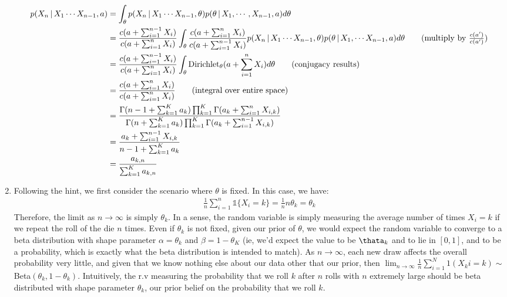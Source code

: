 \documentclass[submit]{harvardml}
\newcommand{\given}{\,|\,}
\theoremstyle{plain}
\begin{document}
\begin{enumerate}[label=(\alph*)]
\begin{align*}
p(X_n \given X_1 \cdots X_{n-1},a) &= \int_{\theta} p(X_n \given  X_1 \cdots X_{n-1}, \theta)p(\theta \given X_1, \cdots, X_{n-1}, a)  d\theta \\
&= \frac{c(a + \sum_{i=1}^{n-1}X_i)}{c(a + \sum_{i=1}^n X_i)} \int_{\theta} \frac{c(a + \sum_{i=1}^n X_i)}{c(a + \sum_{i=1}^{n-1}X_i)} p(X_n \given  X_1 \cdots X_{n-1}, \theta)p(\theta \given X_1, \cdots X_{n-1}, a) d\theta \tag{multiply by $\frac{c(a')}{c(a')}$} \\
&= \frac{c(a + \sum_{i=1}^{n-1}X_i)}{c(a + \sum_{i=1}^n X_i)} \int_{\theta} \text{Dirichlet}_{\theta}(a + \sum_{i=1}^n X_i) d\theta \tag{conjugacy results}\\
&= \frac{c(a + \sum_{i=1}^n X_i)}{c(a + \sum_{i=1}^n X_i)} \tag{integral over entire space} \\
&= \frac{\Gamma(n - 1 + \sum_{k=1}^{K}{a_k})\prod_{k=1}^K \Gamma(a_k + \sum_{i=1}^n X_{i,k})}{\Gamma(n + \sum_{k=1}^K a_k)\prod_{k=1}^K \Gamma(a_k + \sum_{i=1}^{n-1}X_{i,k})} \\
&= \frac{a_k + \sum_{i=1}^{n-1}X_{i,k}}{n - 1 + \sum_{k=1}^K a_k}\\
&= \frac{a_{k,n}}{\sum_{k=1}^K a_{k,n}}
\end{align*}
\item Following the hint, we first consider the scenario where $\theta$ is fixed. In this case, we have:
\begin{align*}
\frac{1}{n} \sum_{i=1}^n \mathbb{1} \{X_i = k\} =  \frac{1}{n}n\theta_k = \theta_k
\end{align*}
Therefore, the limit as $n \to \infty$ is simply $\theta_k$. In a sense, the random variable is simply measuring the average number of times $X_i = k$ if we repeat the roll of the die $n$ times. Even if $\theta_k$ is not fixed, given our prior of $\theta$, we would expect the random variable to converge to a beta distribution with shape parameter $\alpha = \theta_k$ and $\beta = 1 - \theta_K$ (ie, we'd expect the value to be $\thata_k$ and to lie in $[0,1]$, and to be a probability, which is exactly what the beta distribution is intended to match). As $n \to \infty$, each new draw affects the overall probability very little, and given that we know nothing else about our data other that our prior, then  $\lim_{n\to\infty} \frac{1}{n}\sum_{i=1}^{N} \mathcal{1} (X_ki = k) \sim$ Beta$(\theta_k, 1- \theta_k)$.
Intuitively, the r.v measuring the probability that we roll $k$ after $n$ rolls with $n$ extremely large should be beta distributed with shape parameter $\theta_k$, our prior belief on the probability that we roll $k$.


\end{enumerate}
\end{document}

